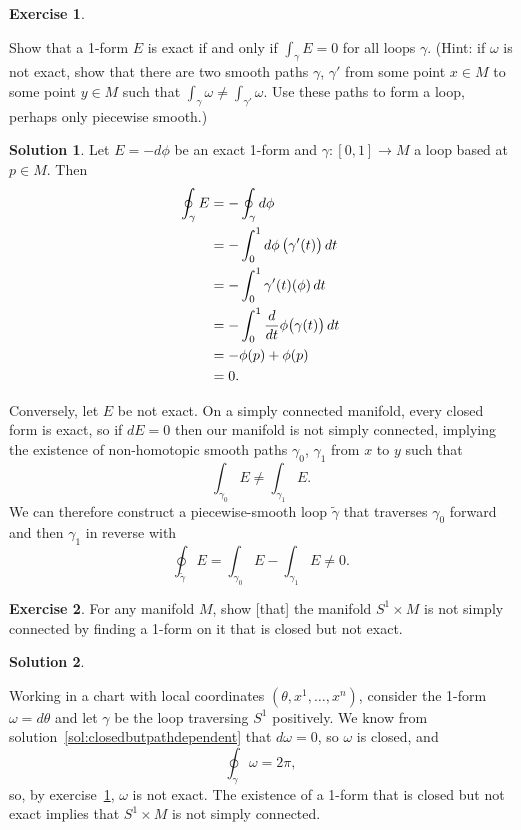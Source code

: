 \documentclass[11pt, a4paper]{report}
\theoremstyle{definition}
\newtheorem{exercise}{Exercise}[part]
\newtheorem{solution}{Solution}[part]
\newenvironment{ex}{\begin{exercise}}{\end{exercise}\pagebreak[1]}
\newenvironment{sol}{\begin{solution}}{\end{solution}\pagebreak[3]}
\newcommand*{\op}[1]{\ensuremath\mathop{}\mathopen{}#1}
\renewcommand*{\d}{\op{d}}
\begin{document}
\begin{ex}\label{ex:exactifintegraloverloopiszero}

Show that a 1-form $E$ is exact if and only if $\int_\gamma E = 0$ for all loops $\gamma$. (Hint: if $\omega$ is not exact, show that there are two smooth paths $\gamma$, $\gamma'$ from some point $x \in M$ to some point $y \in M$ such that $\int_\gamma \omega \neq \int_{\gamma'} \omega$. Use these paths to form a loop, perhaps only piecewise smooth.)

\end{ex}

\begin{sol}

Let $E = -d\phi$ be an exact 1-form and $\gamma: [0, 1] \to M$ a loop based at $p \in M$. Then
\begin{align*}
    \oint_\gamma E &= - \oint_\gamma d\phi \\
                   &= - \int_0^1 d\phi \, \bigl( \gamma'(t) \bigr) \d t \\
                   &= - \int_0^1 \gamma'(t)(\phi) \d t \\
                   &= - \int_0^1 \frac{d}{dt} \phi \bigl( \gamma(t) \bigr) \d t \\
                   &= - \phi(p) + \phi(p) \\
                   &= 0.
\end{align*}

Conversely, let $E$ be not exact. On a simply connected manifold, every closed form is exact, so if $dE = 0$ then our manifold is not simply connected, implying the existence of non-homotopic smooth paths $\gamma_0$, $\gamma_1$ from $x$ to $y$ such that
\[
    \int_{\gamma_0} E \neq \int_{\gamma_1} E.
\]
We can therefore construct a piecewise-smooth loop $\tilde{\gamma}$ that traverses $\gamma_0$ forward and then $\gamma_1$ in reverse with
\[
    \oint_{\tilde{\gamma}} E = \int_{\gamma_0} E - \int_{\gamma_1} E \neq 0.
\]

\end{sol}

\begin{ex}

For any manifold $M$, show [that] the manifold $S^1 \times M$ is not simply connected by finding a 1-form on it that is closed but not exact.

\end{ex}

\begin{sol}\label{sol:s1productnotsimplyconnected}

Working in a chart with local coordinates $(\theta, x^1, \ldots, x^n)$, consider the 1-form $\omega = d\theta$ and let $\gamma$ be the loop traversing $S^1$ positively.
We know from solution~\ref{sol:closedbutpathdependent} that $d \omega = 0$, so $\omega$ is closed, and
\[
    \oint_\gamma \omega = 2 \pi,
\]
so, by exercise~\ref{ex:exactifintegraloverloopiszero}, $\omega$ is not exact.
The existence of a 1-form that is closed but not exact implies that $S^1 \times M$ is not simply connected.

\end{sol}
\end{document}
